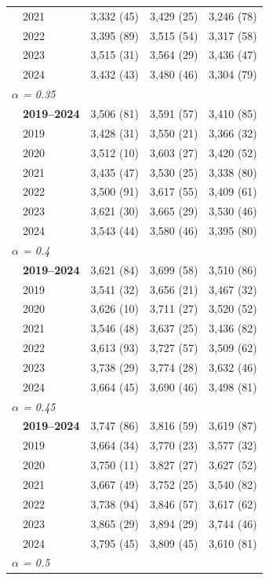 \begin{table}[htbp]
\begin{tabular}{llrrr}
 & 2021 & 3,332 (45) & 3,429 (25) & 3,246 (78) \\
 & 2022 & 3,395 (89) & 3,515 (54) & 3,317 (58) \\
 & 2023 & 3,515 (31) & 3,564 (29) & 3,436 (47) \\
 & 2024 & 3,432 (43) & 3,480 (46) & 3,304 (79) \\
\midrule
\multicolumn{5}{l}{\textit{$\alpha$ = 0.35}} \\
 & \textbf{2019–2024} & 3,506 (81) & 3,591 (57) & 3,410 (85) \\
 & 2019 & 3,428 (31) & 3,550 (21) & 3,366 (32) \\
 & 2020 & 3,512 (10) & 3,603 (27) & 3,420 (52) \\
 & 2021 & 3,435 (47) & 3,530 (25) & 3,338 (80) \\
 & 2022 & 3,500 (91) & 3,617 (55) & 3,409 (61) \\
 & 2023 & 3,621 (30) & 3,665 (29) & 3,530 (46) \\
 & 2024 & 3,543 (44) & 3,580 (46) & 3,395 (80) \\
\midrule
\multicolumn{5}{l}{\textit{$\alpha$ = 0.4}} \\
 & \textbf{2019–2024} & 3,621 (84) & 3,699 (58) & 3,510 (86) \\
 & 2019 & 3,541 (32) & 3,656 (21) & 3,467 (32) \\
 & 2020 & 3,626 (10) & 3,711 (27) & 3,520 (52) \\
 & 2021 & 3,546 (48) & 3,637 (25) & 3,436 (82) \\
 & 2022 & 3,613 (93) & 3,727 (57) & 3,509 (62) \\
 & 2023 & 3,738 (29) & 3,774 (28) & 3,632 (46) \\
 & 2024 & 3,664 (45) & 3,690 (46) & 3,498 (81) \\
\midrule
\multicolumn{5}{l}{\textit{$\alpha$ = 0.45}} \\
 & \textbf{2019–2024} & 3,747 (86) & 3,816 (59) & 3,619 (87) \\
 & 2019 & 3,664 (34) & 3,770 (23) & 3,577 (32) \\
 & 2020 & 3,750 (11) & 3,827 (27) & 3,627 (52) \\
 & 2021 & 3,667 (49) & 3,752 (25) & 3,540 (82) \\
 & 2022 & 3,738 (94) & 3,846 (57) & 3,617 (62) \\
 & 2023 & 3,865 (29) & 3,894 (29) & 3,744 (46) \\
 & 2024 & 3,795 (45) & 3,809 (45) & 3,610 (81) \\
\midrule
\multicolumn{5}{l}{\textit{$\alpha$ = 0.5}} \\

\end{tabular}
\end{table}
